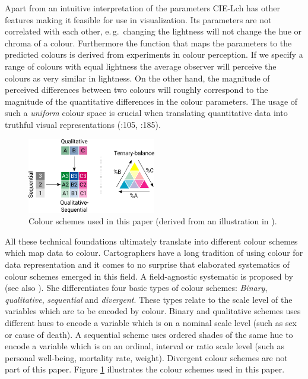 \documentclass{scrartcl}
\begin{document}
Apart from an intuitive interpretation of the parameters CIE-Lch has other features making it feasible for use in visualization. Its parameters are not correlated with each other, e.\,g.~changing the lightness will not change the hue or chroma of a colour. Furthermore the function that maps the parameters to the predicted colours is derived from experiments in colour perception. If we specify a range of colours with equal lightness the average observer will perceive the colours as very similar in lightness. On the other hand, the magnitude of perceived differences between two colours will roughly correspond to the magnitude of the quantitative differences in the colour parameters. The usage of such a \emph{uniform} colour space is crucial when translating quantitative data into truthful visual representations (\cite{Ware2013}:105, \cite{Fairchild2005}:185).

\begin{figure}[!htb]
  \centering
  \includegraphics[width = 0.5\textwidth]{../fig/brewer_subset.pdf}
  \caption{Colour schemes used in this paper (derived from an illustration in \cite{Brewer1994a}).}
  \label{fig:brewer}
\end{figure}

All these technical foundations ultimately translate into different colour schemes which map data to colour. Cartographers have a long tradition of using colour for data representation and it comes to no surprise that elaborated systematics of colour schemes emerged in this field. A field-agnostic systematic is proposed by \textcite{Brewer1994a} (see also \cite{Brewer1994}). She differentiates four basic types of colour schemes: \emph{Binary}, \emph{qualitative}, \emph{sequential} and \emph{divergent}. These types relate to the scale level of the variables which are to be encoded by colour. Binary and qualitative schemes uses different hues to encode a variable which is on a nominal scale level (such as sex or cause of death). A sequential scheme uses ordered shades of the same hue to encode a variable which is on an ordinal, interval or ratio scale level (such as personal well-being, mortality rate, weight). Divergent colour schemes are not part of this paper. Figure \ref{fig:brewer} illustrates the colour schemes used in this paper.
\end{document}
